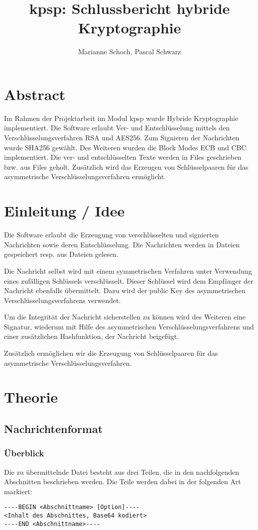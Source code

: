 \documentclass[11pt,a4paper,parskip=half]{scrartcl}
\title{kpsp: Schlussbericht hybride Kryptographie}
\author{Marianne Schoch, Pascal Schwarz}
\begin{document}
\maketitle

\section{Abstract}
Im Rahmen der Projektarbeit im Modul kpsp wurde Hybride Kryptographie implementiert. Die Software erlaubt Ver- und Entschlüsselung mittels den Verschlüsselungsverfahren RSA und AES256. Zum Signieren der Nachrichten wurde SHA256 gewählt. Des Weiteren wurden die Block Modes ECB und CBC implementiert. Die ver- und entschlüsselten Texte werden in Files geschrieben bzw. aus Files geholt.
Zusätzlich wird das Erzeugen von Schlüsselpaaren für das asymmetrische Verschlüsselungsverfahren ermöglicht.

\section{Einleitung / Idee}
Die Software erlaubt die Erzeugung von verschlüsselten und signierten Nachrichten sowie deren Entschlüsselung. Die Nachrichten werden in Dateien gespeichert resp. aus Dateien gelesen.

Die Nachricht selbst wird mit einem symmetrischen Verfahren unter Verwendung eines zufälligen Schlüssels verschlüsselt. Dieser Schlüssel wird dem Empfänger der Nachricht ebenfalls übermittelt. Dazu wird der public Key des asymmetrischen Verschlüsselungsverfahrens verwendet.

Um die Integrität der Nachricht sicherstellen zu können wird des Weiteren eine Signatur, wiederum mit Hilfe des asymmetrischen Verschlüsselungsverfahrens und einer zusätzlichen Hashfunktion, der Nachricht beigefügt.

Zusätzlich ermöglichen wir die Erzeugung von Schlüsselpaaren für das asymmetrische Verschlüsselungsverfahren.

\section{Theorie}
\subsection{Nachrichtenformat}
\subsubsection{Überblick}
Die zu übermittelnde Datei besteht aus drei Teilen, die in den nachfolgenden Abschnitten beschrieben werden. Die Teile werden dabei in der folgenden Art markiert:
\begin{lstlisting}
----BEGIN <Abschnittname> [Option]----
<Inhalt des Abschnittes, Base64 kodiert>
----END <Abschnittname>----
\end{lstlisting}
\end{document}
